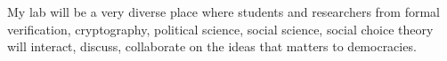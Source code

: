 \documentclass[a4paper]{article}
\begin{document}
My lab will be a very diverse place where students and researchers from formal 
verification, cryptography, 
political science, social science, social choice theory will interact, discuss, 
collaborate on the ideas that matters to democracies.


 

\end{document}
